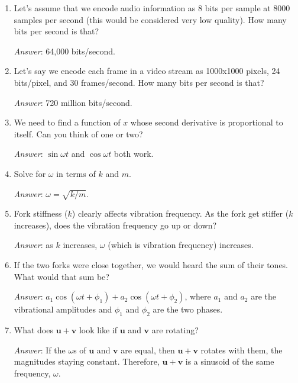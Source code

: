 \begin{enumerate}
\item Let's assume that we encode audio information as 8 bits
  per sample at 8000 samples per second (this would be considered very
  low quality). How many bits per second is that?\label{it:ch1ex1}

  \textit{Answer}: 64,000 bits/second.

\item Let's say we encode each frame in a
  video stream as 1000x1000 pixels, 24 bits/pixel, and 30 frames/second.
  How many bits per second is that?\label{it:ch1ex2}

  \textit{Answer}: 720 million bits/second.

\item We need to find a function of $x$ whose second derivative is proportional
  to itself. Can you think of one or two?\label{it:ch1ex3}

  \textit{Answer}: $\sin\omega t$ and $\cos\omega t$ both work.

\item Solve for $\omega$ in terms of $k$ and $m$.\label{it:ch1ex4}

  \textit{Answer}: $\omega = \sqrt{k/m}$.

\item Fork stiffness ($k$) clearly affects vibration frequency. As the
  fork get stiffer ($k$ increases), does the vibration frequency go up
  or down?\label{it:ch1ex5}

  \textit{Answer}: as $k$ increases, $\omega$ (which is vibration
  frequency) increases.

\item If the two forks were close
  together, we would heard the sum of their tones. What would that sum
  be?\label{it:ch1ex6}

  \textit{Answer}: $a_1 \cos(\omega t + \phi_1) + a_2
  \cos(\omega t + \phi_2)$, where $a_1$ and $a_2$ are the vibrational
  amplitudes and $\phi_1$ and $\phi_2$ are the two phases.

\item What does $\mathbf{u}+\mathbf{v}$ look like if
  $\mathbf{u}$ and $\mathbf{v}$ are rotating?\label{it:ch1ex7}

  \textit{Answer}: If
  the $\omega$s of $\mathbf{u}$ and $\mathbf{v}$ are equal, then
  $\mathbf{u}+\mathbf{v}$ rotates with them, the magnitudes staying
  constant. Therefore, $\mathbf{u}+\mathbf{v}$ is a sinusoid of the same
  frequency, $\omega$.


\end{enumerate}
